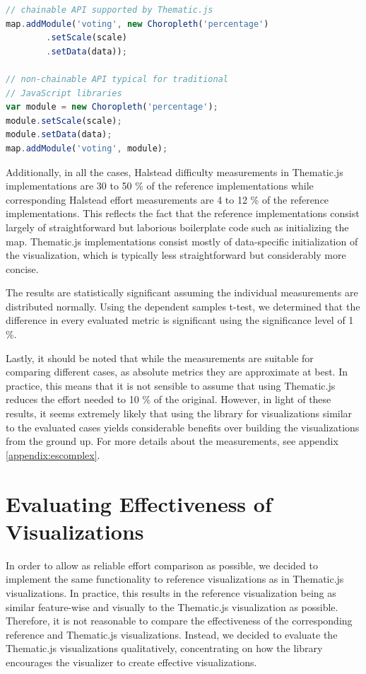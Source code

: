 \begin{lstlisting}[caption=Thematic.js API format. The code has been simplified to increase readability.,language=JavaScript,label=listing:chainableapi]
// chainable API supported by Thematic.js
map.addModule('voting', new Choropleth('percentage')
        .setScale(scale)
        .setData(data));

// non-chainable API typical for traditional
// JavaScript libraries
var module = new Choropleth('percentage');
module.setScale(scale);
module.setData(data);
map.addModule('voting', module);
\end{lstlisting}

Additionally, in all the cases, Halstead difficulty measurements in Thematic.js implementations are 30 to 50 \% of the reference implementations while corresponding Halstead effort measurements are 4 to 12 \% of the reference implementations. This reflects the fact that the reference implementations consist largely of straightforward but laborious boilerplate code such as initializing the map. Thematic.js implementations consist mostly of data-specific initialization of the visualization, which is typically less straightforward but considerably more concise.

The results are statistically significant assuming the individual measurements are distributed normally. Using the dependent samples t-test, we determined that the difference in every evaluated metric is significant using the significance level of 1 \%.

Lastly, it should be noted that while the measurements are suitable for comparing different cases, as absolute metrics they are approximate at best. In practice, this means that it is not sensible to assume that using Thematic.js reduces the effort needed to 10 \% of the original. However, in light of these results, it seems extremely likely that using the library for visualizations similar to the evaluated cases yields considerable benefits over building the visualizations from the ground up. For more details about the measurements, see appendix \ref{appendix:escomplex}.

\section{Evaluating Effectiveness of Visualizations}
\label{section:evaluatingeffectiveness}

In order to allow as reliable effort comparison as possible, we decided to implement the same functionality to reference visualizations as in Thematic.js visualizations. In practice, this results in the reference visualization being as similar feature-wise and visually to the Thematic.js visualization as possible. Therefore, it is not reasonable to compare the effectiveness of the corresponding reference and Thematic.js visualizations. Instead, we decided to evaluate the Thematic.js visualizations qualitatively, concentrating on how the library encourages the visualizer to create effective visualizations.

